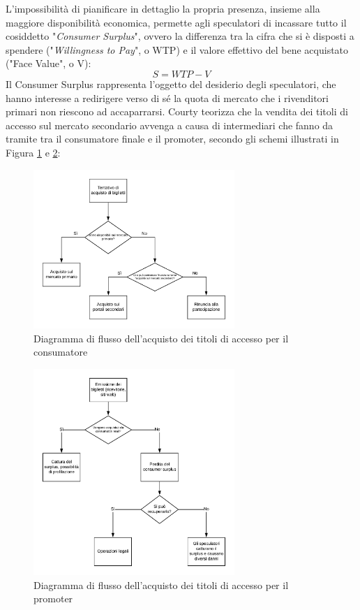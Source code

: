 L'impossibilità di pianificare in dettaglio la propria presenza, insieme alla maggiore disponibilità economica, permette agli speculatori di incassare tutto il cosiddetto "\textit{Consumer Surplus}", ovvero la differenza tra la cifra che si è disposti a spendere ("\textit{Willingness to Pay}", o WTP) e il valore effettivo del bene acquistato ("Face Value", o V): 
\begin{equation}
S = WTP - V
\end{equation}
Il Consumer Surplus rappresenta l'oggetto del desiderio degli speculatori, che hanno interesse a redirigere verso di sé la quota di mercato che i rivenditori primari non riescono ad accaparrarsi. 
Courty teorizza che la vendita dei titoli di accesso sul mercato secondario avvenga a causa di intermediari che fanno da tramite tra il consumatore finale e il promoter, secondo gli schemi illustrati in Figura \ref{flowcons} e \ref{flowprom}: 
\begin{figure}[htbp]
	\centering
	\includegraphics[width=0.68\textwidth]{chapter2/immagini/flow_cons}
	\caption{Diagramma di flusso dell'acquisto dei titoli di accesso per il consumatore}
	\label{flowcons}
\end{figure}
\begin{figure}[htbp]
	\centering
	\includegraphics[width=0.68\textwidth]{chapter2/immagini/flow_prom}
	\caption{Diagramma di flusso dell'acquisto dei titoli di accesso per il promoter}
	\label{flowprom}
\end{figure}
